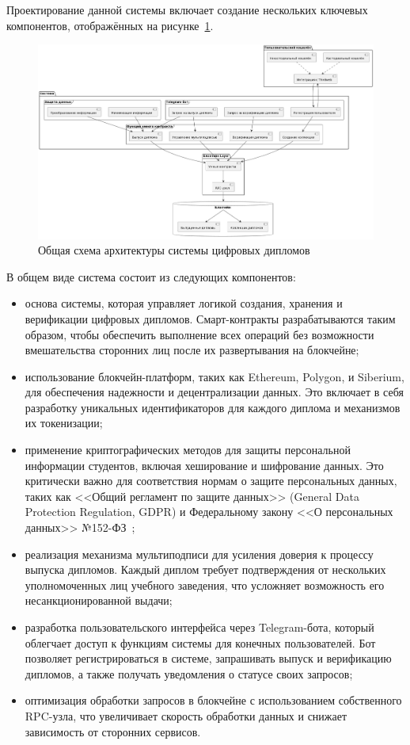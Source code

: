Проектирование данной системы включает создание нескольких ключевых компонентов, отображённых на рисунке~\ref{fig:sys_arch}.

\begin{figure}[H]
	\centering
	\includegraphics[width=.9\textwidth]{images/sys_arch.png}
	\parskip=6pt
	\caption{Общая схема архитектуры системы цифровых дипломов}
	\label{fig:sys_arch}
\end{figure}

В общем виде система состоит из следующих компонентов:

\begin{itemize}
    \item основа системы, которая управляет логикой создания, хранения и верификации цифровых дипломов. Смарт-контракты разрабатываются таким образом, чтобы обеспечить выполнение всех операций без возможности вмешательства сторонних лиц после их развертывания на блокчейне;
    \item использование блокчейн-платформ, таких как Ethereum, Polygon, и Siberium, для обеспечения надежности и децентрализации данных. Это включает в себя разработку уникальных идентификаторов для каждого диплома и механизмов их токенизации;
    \item применение криптографических методов для защиты персональной информации студентов, включая хеширование и шифрование данных. Это критически важно для соответствия нормам о защите персональных данных, таких как <<Общий регламент по защите данных>> (General Data Protection Regulation, GDPR) и Федеральному закону <<О персональных данных>> №152-ФЗ~\cite{bib:152fz};
    \item реализация механизма мультиподписи для усиления доверия к процессу выпуска дипломов. Каждый диплом требует подтверждения от нескольких уполномоченных лиц учебного заведения, что усложняет возможность его несанкционированной выдачи;
    \item разработка пользовательского интерфейса через Telegram-бота, который облегчает доступ к функциям системы для конечных пользователей. Бот позволяет регистрироваться в системе, запрашивать выпуск и верификацию дипломов, а также получать уведомления о статусе своих запросов;
    \item оптимизация обработки запросов в блокчейне с использованием собственного RPC-узла, что увеличивает скорость обработки данных и снижает зависимость от сторонних сервисов.
\end{itemize}

